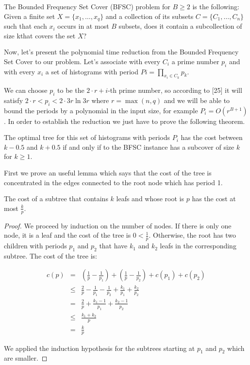 The Bounded Frequency Set Cover (BFSC) problem for $B \ge 2$ is the following: Given a finite set $X=\{x_1,\ldots,x_q\}$ and a collection of its subsets $C=\{C_1,\ldots, C_n\}$ such that each $x_i$ occurs in at most $B$ subsets, does it contain a subcollection of size kthat covers the set $X$?

Now, let’s present the polynomial time reduction from the Bounded Frequency Set Cover to our problem. Let’s associate with every $C_i$ a prime number $p_i$ and with every $x_i$ a set of histograms with period $Pi=\prod_{x_i\in C_k}p_k$.

We can choose $p_i$ to be the $2\cdot r+i$-th prime number, so according to [25] it will satisfy $2\cdot r <p_i<2\cdot 3r \ln 3r$ where $r=\max(n, q)$ and we will be able to bound the periods by a polynomial in the input size, for example $P_i=O(r^{B+1})$. In order to establish the reduction we just have to prove the following theorem. 

\begin{theorem}
The optimal tree for this set of histograms with periods $P_i$ has the cost between $k-0.5$ and $k+0.5$ if and only if to the BFSC instance has a subcover of size $k$ for $k \ge  1$.
\end{theorem}

First we prove an useful lemma which says that the cost of the tree is concentrated in the edges connected to the root node which has period 1.

\begin{lemma}
The cost of a subtree that contains $k$ leafs and whose root is $p$ has the cost at most $\frac{k}{p}$.
\end{lemma}

\begin{proof}
We proceed by induction on the number of nodes. If there is only one node, it is a leaf and the cost of the tree is $0<\frac 1p$. Otherwise, the root has two children with periods $p_1$ and $p_2$ that have $k_1$ and $k_2$ leafs in the corresponding subtree. The cost of the tree is: 

\begin{eqnarray*}
c(p) &=& \left(\frac 1p - \frac 1 {p_1}\right) + \left(\frac 1 p - \frac 1 {p_2}\right)+c(p_1)+c(p_2) \\
    &\leq & \frac 2p-\frac 1 {p_1}-\frac 1 {p_2} + \frac {k_1}{p_1}+\frac {k_2}{p_2} \\
    &=&\frac 2p + \frac{k_1-1}{p_1}+\frac{k_2-1}{p_2} \\
    &\leq & \frac{k_1+k_2}p \\
    &=&\frac kp
\end{eqnarray*}

We applied the induction hypothesis for the subtrees starting at $p_1$ and $p_2$ which are smaller. 
\end{proof}


